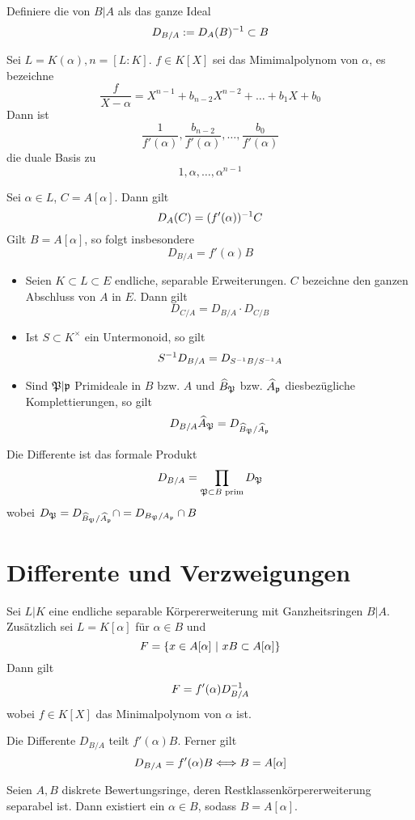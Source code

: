 \Def{}
Definiere die  von $B|A$ als das ganze Ideal
\[ D_{B/A} := D_A(B)^{-1} \subset B \]

\Satz{}
Sei $L = K(\alpha), n = [L:K]$. $f \in K[X]$ sei das Mimimalpolynom von $\alpha$, es bezeichne
\[ \frac{f}{X-\alpha} = X^{n-1} + b_{n-2}X^{n-2} + \ldots + b_1X + b_0 \]
Dann ist
\[ \frac{1}{f'(\alpha)}, \frac{b_{n-2}}{f'(\alpha)}, \ldots , \frac{b_{0}}{f'(\alpha)} \]
die duale Basis zu
\[ 1, \alpha, \ldots, \alpha^{n-1} \]

\Kor{}
Sei $\alpha \in L$, $C = A[\alpha]$. Dann gilt
\[ D_A(C) = (f'(\alpha))^{-1} C \]
Gilt $B = A[\alpha]$, so folgt insbesondere
\[ D_{B/A} = f'(\alpha)B \]

\Satz{}
\begin{itemize}
	\item Seien $K\subset L\subset E$ endliche, separable Erweiterungen. $C$ bezeichne den ganzen Abschluss von $A$ in $E$. Dann gilt
	\[ D_{C/A} = D_{B/A} \cdot D_{C/B} \]
	\item Ist $S \subset K^\times$ ein Untermonoid, so gilt
	\[ S^{-1} D_{B/A} = D_{S^{-1} B / S^{-1} A} \]
	\item Sind $\mathfrak{P} |\mathfrak{p}$ Primideale in $B$ bzw. $A$ und $\widehat{B}_{\mathfrak{P}}$ bzw. $\widehat{A}_{\mathfrak{p}}$ diesbezügliche Komplettierungen, so gilt
	\[ D_{B/A} \widehat{A}_{\mathfrak{P}} = D_{\widehat{B}_{\mathfrak{P}} / \widehat{A}_{\mathfrak{p}}} \]
\end{itemize}

\Kor{}
Die Differente ist das formale Produkt
\[ D_{B/A} = \prod_{ \mathfrak{P} \subset B \text{ prim}} D_{\mathfrak{P}} \]
wobei $D_{\mathfrak{P}} = D_{\widehat{B}_{\mathfrak{P}} / \widehat{A}_{\mathfrak{p}}} \cap = D_{B_{\mathfrak{P}} / A_{\mathfrak{p}}}\cap B $

\section{Differente und Verzweigungen}
\Lem{}
Sei $L|K$ eine endliche separable Körpererweiterung mit Ganzheitsringen $B|A$.\\
Zusätzlich sei $L = K[\alpha]$ für $\alpha \in B$ und
\[ F= \set{x \in A[\alpha]}{xB \subset A[\alpha]} \]
Dann gilt
\[ F = f'(\alpha)D^{-1}_{B/A} \]
wobei $f\in K[X]$ das Minimalpolynom von $\alpha$ ist.

\Kor{}
Die Differente $D_{B/A}$ teilt $f'(\alpha) B$. Ferner gilt
\[ D_{B/A} = f'(\alpha) B \overset{}{\Longleftrightarrow} B = A[\alpha] \]

\Satz{}
Seien $A,B$ diskrete Bewertungsringe, deren Restklassenkörpererweiterung separabel ist. Dann existiert ein $\alpha \in B$, sodass $B = A[\alpha]$.


